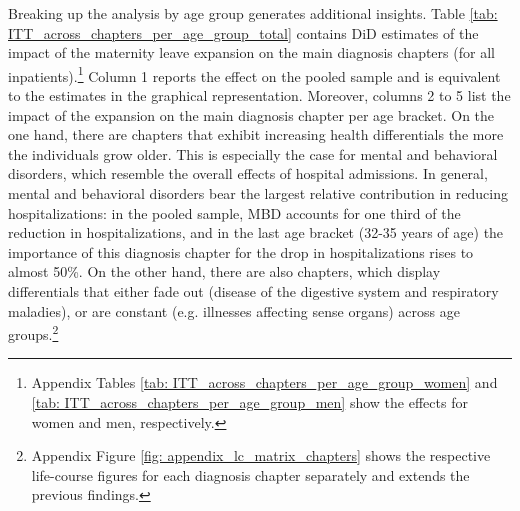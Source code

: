 \documentclass[11pt, a4paper,draft]{article} %
\begin{document}
Breaking up the analysis by age group generates additional insights. Table \ref{tab: ITT_across_chapters_per_age_group_total} contains DiD estimates of the impact of the maternity leave expansion on the main diagnosis chapters (for all inpatients).\footnote{Appendix Tables \ref{tab: ITT_across_chapters_per_age_group_women} and \ref{tab: ITT_across_chapters_per_age_group_men} show the effects for women and men, respectively.} Column 1 reports the effect on the pooled sample and is equivalent to the estimates in the graphical representation. Moreover, columns 2 to 5 list the impact of the expansion on the main diagnosis chapter per age bracket. On the one hand, there are chapters that exhibit increasing health differentials the more the individuals grow older. This is especially the case for mental and behavioral disorders, which resemble the overall effects of hospital admissions. In general, mental and behavioral disorders bear the largest relative contribution in reducing hospitalizations: in the pooled sample, MBD accounts for one third of the reduction in hospitalizations, and in the last age bracket (32-35 years of age) the importance of this diagnosis chapter for the drop in hospitalizations rises to almost 50\%. On the other hand, there are also chapters, which display differentials that either fade out (disease of the digestive system and respiratory maladies), or are constant (e.g. illnesses affecting sense organs) across age groups.\footnote{Appendix Figure \ref{fig: appendix_lc_matrix_chapters} shows the respective life-course figures for each diagnosis chapter separately and extends the previous findings.}\newline 


\bigskip
\end{document}
